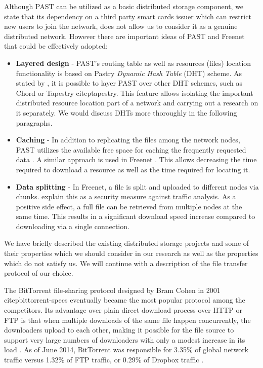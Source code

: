 Although PAST can be utilized as a basic distributed storage
component, we state that its dependency on a third party smart
cards issuer which can restrict new users to join the network,
does not allow us to consider it as a genuine distributed network.
However there are important ideas of PAST and Freenet that could be
effectively adopted:
\begin{itemize}
\item \textbf{Layered design} - PAST's routing table as well
as resources (files) location functionality is based on Pastry
\citep{pastry} \emph{Dynamic Hash Table} (DHT) scheme. As stated by
\citet{past}, it is possible to layer PAST over other DHT schemes,
such as Chord \citep{chord-01} or Tapestry citep{tapestry}.
This feature allows isolating the important distributed resource
location part of a \pp network and carrying out a research on it
separately. We would discuss DHTs more thoroughly in the following
paragraphs.

\item \textbf{Caching} - In addition to replicating the files among
the network nodes, PAST utilizes the available free space for caching
the frequently requested data \citep{past-caching}. A similar approach
is used in Freenet \citep{freenet}. This allows decreasing the time
required to download a resource as well as the time required for
locating it.

\item \textbf{Data splitting} - In Freenet, a file is split and
uploaded to different nodes via chunks. \citet{dark-freenet} explain
this as a security measure against traffic analysis. As a positive
side effect, a full file can be retrieved from multiple nodes
at the same time. This results in a significant download speed
increase compared to downloading via a single connection.
\end{itemize}

We have briefly described the existing distributed storage projects
and some of their properties which we should consider in our research
as well as the properties which do not satisfy us. We will continue
with a description of the file transfer protocol of our choice.

The BitТorrent file-sharing protocol designed by Bram Cohen in 2001
citep{bittorrent-specs} eventually became the most popular protocol
among the competitors.
Its advantage over plain direct download process over HTTP or FTP
is that when multiple downloads of the same file happen concurrently,
the downloaders upload to each other, making it possible for the file
source to support very large numbers of downloaders with only a modest
increase in its load \citep{bittorrent-specs}.
As of June 2014, BitTorrent was responsible for 3.35\% of global
network traffic versus 1.32\% of FTP traffic, or 0.29\% of
Dropbox traffic \citep{paloalto:traffic}.

